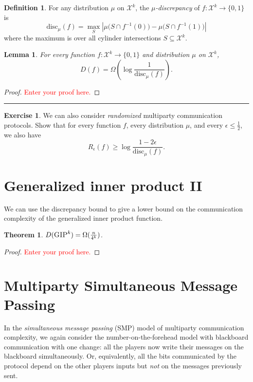 \documentclass[11pt]{amsart}
\theoremstyle{plain}
\newtheorem{theorem}{Theorem}
\newtheorem{lemma}{Lemma}
\theoremstyle{definition}
\newtheorem{definition}{Definition}
\newtheorem{exercise}{Exercise}
\theoremstyle{plain}
\newcommand{\calX}{\mathcal{X}}
\newcommand{\disc}{\mathrm{disc}}
\newcommand{\GIP}{\textsc{GIP}}
\newcommand{\exercises}{\bigskip \noindent\rule{8cm}{0.4pt} \medskip}
\newcommand{\replacethistext}[1]{\textcolor{red}{#1}}
\begin{document}
\begin{definition}
For any distribution $\mu$ on $\calX^k$, 
the \emph{$\mu$-discrepancy} of $f : \calX^k \to \{0,1\}$ is
\[
\disc_\mu(f) = \max_{S} 
\left| \mu\big( S \cap f^{-1}(0) \big) - \mu\big( S \cap f^{-1}(1)\big) \right|
\]
where the maximum is over all cylinder intersections $S \subseteq \calX^k$.
\end{definition}


\begin{lemma}
For every function $f : \calX^k \to \{0,1\}$ and distribution $\mu$ on $\calX^k$,
\[
D(f) = \Omega\left( \log \frac{1}{\disc_\mu(f)}\right).
\]
\end{lemma}

\begin{proof}
\replacethistext{Enter your proof here.}
\end{proof}

\exercises

\begin{exercise}
We can also consider \emph{randomized} multiparty communication protocols. Show that for every function $f$, every distribution $\mu$, and every $\epsilon \le \frac12$, we also have
\[
R_\epsilon(f) \ge \log \frac{1-2\epsilon}{\disc_\mu(f)}.
\]
\end{exercise}


\newpage 
\section{Generalized inner product II}

We can use the discrepancy bound to give a lower bound on the communication complexity of the generalized inner product function.

\begin{theorem}
$D(\GIP^k) = \Omega(\frac{n}{4^k})$.
\end{theorem}

\begin{proof}
\replacethistext{Enter your proof here.}
\end{proof}



\newpage 
\section{Multiparty Simultaneous Message Passing}

In the \emph{simultaneous message passing} (SMP) model of multiparty communication complexity, we again consider the number-on-the-forehead model with blackboard communication with one change: all the players now write their messages on the blackboard simultaneously. Or, equivalently, all the bits communicated by the protocol depend on the other players inputs but \emph{not} on the messages previously sent.
\end{document}
